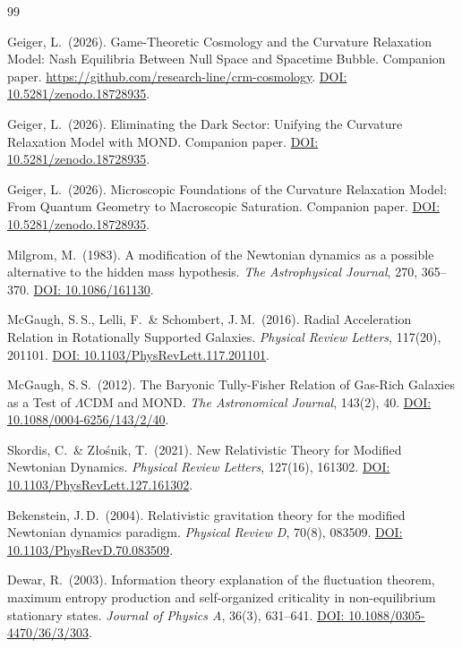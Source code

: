 \documentclass[aps,prd,twocolumn,superscriptaddress,nofootinbib]{revtex4-2}
\begin{document}
\begin{thebibliography}{99}

Geiger, L.\ (2026).
Game-Theoretic Cosmology and the Curvature Relaxation Model: Nash Equilibria Between Null Space and Spacetime Bubble.
Companion paper. \url{https://github.com/research-line/crm-cosmology}.
\href{https://doi.org/10.5281/zenodo.18728935}{DOI: 10.5281/zenodo.18728935}.

Geiger, L.\ (2026).
Eliminating the Dark Sector: Unifying the Curvature Relaxation Model with MOND.
Companion paper.
\href{https://doi.org/10.5281/zenodo.18728935}{DOI: 10.5281/zenodo.18728935}.

Geiger, L.\ (2026).
Microscopic Foundations of the Curvature Relaxation Model: From Quantum Geometry to Macroscopic Saturation.
Companion paper.
\href{https://doi.org/10.5281/zenodo.18728935}{DOI: 10.5281/zenodo.18728935}.

Milgrom, M.\ (1983).
A modification of the Newtonian dynamics as a possible alternative to the hidden mass hypothesis.
\textit{The Astrophysical Journal}, 270, 365--370.
\href{https://doi.org/10.1086/161130}{DOI: 10.1086/161130}.

McGaugh, S.\,S., Lelli, F.\ \& Schombert, J.\,M.\ (2016).
Radial Acceleration Relation in Rotationally Supported Galaxies.
\textit{Physical Review Letters}, 117(20), 201101.
\href{https://doi.org/10.1103/PhysRevLett.117.201101}{DOI: 10.1103/PhysRevLett.117.201101}.

McGaugh, S.\,S.\ (2012).
The Baryonic Tully-Fisher Relation of Gas-Rich Galaxies as a Test of $\Lambda$CDM and MOND.
\textit{The Astronomical Journal}, 143(2), 40.
\href{https://doi.org/10.1088/0004-6256/143/2/40}{DOI: 10.1088/0004-6256/143/2/40}.

Skordis, C.\ \& Z{\l}o\'snik, T.\ (2021).
New Relativistic Theory for Modified Newtonian Dynamics.
\textit{Physical Review Letters}, 127(16), 161302.
\href{https://doi.org/10.1103/PhysRevLett.127.161302}{DOI: 10.1103/PhysRevLett.127.161302}.

Bekenstein, J.\,D.\ (2004).
Relativistic gravitation theory for the modified Newtonian dynamics paradigm.
\textit{Physical Review D}, 70(8), 083509.
\href{https://doi.org/10.1103/PhysRevD.70.083509}{DOI: 10.1103/PhysRevD.70.083509}.

Dewar, R.\ (2003).
Information theory explanation of the fluctuation theorem, maximum entropy production and self-organized criticality in non-equilibrium stationary states.
\textit{Journal of Physics A}, 36(3), 631--641.
\href{https://doi.org/10.1088/0305-4470/36/3/303}{DOI: 10.1088/0305-4470/36/3/303}.


\end{thebibliography}
\end{document}
